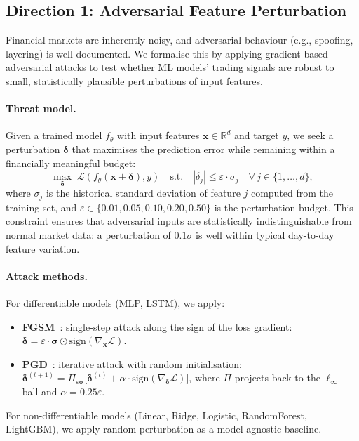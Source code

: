 \documentclass[preprint,review,12pt]{elsarticle}
\begin{document}
\subsection{Direction 1: Adversarial Feature Perturbation}
\label{sec:adv_method}

Financial markets are inherently noisy, and adversarial behaviour (e.g., spoofing, layering) is well-documented.
We formalise this by applying gradient-based adversarial attacks to test whether ML models' trading signals are robust to small, statistically plausible perturbations of input features.

\paragraph{Threat model.}
Given a trained model $f_\theta$ with input features $\mathbf{x} \in \mathbb{R}^d$ and target $y$, we seek a perturbation $\boldsymbol{\delta}$ that maximises the prediction error while remaining within a financially meaningful budget:
\begin{equation}
\max_{\boldsymbol{\delta}} \; \mathcal{L}(f_\theta(\mathbf{x} + \boldsymbol{\delta}), y) \quad \text{s.t.} \quad |\delta_j| \leq \varepsilon \cdot \sigma_j \quad \forall\, j \in \{1, \ldots, d\},
\label{eq:adv_threat}
\end{equation}
where $\sigma_j$ is the historical standard deviation of feature $j$ computed from the training set, and $\varepsilon \in \{0.01, 0.05, 0.10, 0.20, 0.50\}$ is the perturbation budget.
This constraint ensures that adversarial inputs are statistically indistinguishable from normal market data: a perturbation of $0.1\sigma$ is well within typical day-to-day feature variation.

\paragraph{Attack methods.}
For differentiable models (MLP, LSTM), we apply:
\begin{itemize}[leftmargin=1.4em]
  \item \textbf{FGSM}~\citep{ref_goodfellow_fgsm}: single-step attack along the sign of the loss gradient:
  $\boldsymbol{\delta} = \varepsilon \cdot \boldsymbol{\sigma} \odot \text{sign}(\nabla_{\mathbf{x}} \mathcal{L})$.
  \item \textbf{PGD}~\citep{ref_madry_pgd}: iterative attack with random initialisation:
  $\boldsymbol{\delta}^{(t+1)} = \Pi_{\varepsilon \boldsymbol{\sigma}}\bigl[\boldsymbol{\delta}^{(t)} + \alpha \cdot \text{sign}(\nabla_{\boldsymbol{\delta}} \mathcal{L})\bigr]$,
  where $\Pi$ projects back to the $\ell_\infty$-ball and $\alpha = 0.25\varepsilon$.
\end{itemize}
For non-differentiable models (Linear, Ridge, Logistic, RandomForest, LightGBM), we apply random perturbation as a model-agnostic baseline.
\end{document}
